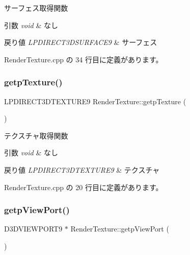 サーフェス取得関数 


\begin{DoxyParams}{引数}
{\em void} & なし \\
\hline
\end{DoxyParams}

\begin{DoxyRetVals}{戻り値}
{\em L\+P\+D\+I\+R\+E\+C\+T3\+D\+S\+U\+R\+F\+A\+C\+E9} & サーフェス \\
\hline
\end{DoxyRetVals}


 Render\+Texture.\+cpp の 34 行目に定義があります。

\mbox{\label{class_render_texture_a8ba10b27c722fd529a09c0192fad3217}} 
\subsubsection{\texorpdfstring{getp\+Texture()}{getpTexture()}}
{\footnotesize\ttfamily L\+P\+D\+I\+R\+E\+C\+T3\+D\+T\+E\+X\+T\+U\+R\+E9 Render\+Texture\+::getp\+Texture (\begin{DoxyParamCaption}{ }\end{DoxyParamCaption})}



テクスチャ取得関数 


\begin{DoxyParams}{引数}
{\em void} & なし \\
\hline
\end{DoxyParams}

\begin{DoxyRetVals}{戻り値}
{\em L\+P\+D\+I\+R\+E\+C\+T3\+D\+T\+E\+X\+T\+U\+R\+E9} & テクスチャ \\
\hline
\end{DoxyRetVals}


 Render\+Texture.\+cpp の 20 行目に定義があります。

\mbox{\label{class_render_texture_a329c2c45fcfe260ec00215a6341a4d6d}} 
\subsubsection{\texorpdfstring{getp\+View\+Port()}{getpViewPort()}}
{\footnotesize\ttfamily D3\+D\+V\+I\+E\+W\+P\+O\+R\+T9 $\ast$ Render\+Texture\+::getp\+View\+Port (\begin{DoxyParamCaption}{ }\end{DoxyParamCaption})}



